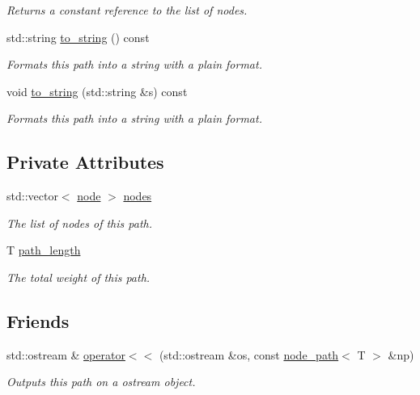 \begin{DoxyCompactItemize}
\begin{DoxyCompactList}\small\item\em Returns a constant reference to the list of nodes. \end{DoxyCompactList}\item 
std\-::string \hyperlink{classlgraph_1_1node__path_a3b1a3f9fbe6ef537d5c2d0cd11fdf001}{to\-\_\-string} () const 
\begin{DoxyCompactList}\small\item\em Formats this path into a string with a plain format. \end{DoxyCompactList}\item 
void \hyperlink{classlgraph_1_1node__path_a87d9396f83248eca743bd97c3adde674}{to\-\_\-string} (std\-::string \&s) const 
\begin{DoxyCompactList}\small\item\em Formats this path into a string with a plain format. \end{DoxyCompactList}\end{DoxyCompactItemize}
\subsection*{Private Attributes}
\begin{DoxyCompactItemize}
\item 
\hypertarget{classlgraph_1_1node__path_ae2335b4883c602186ce2dbba9d679b1e}{std\-::vector$<$ \hyperlink{namespacelgraph_a397169dd66adf725210a30fb7251773e}{node} $>$ \hyperlink{classlgraph_1_1node__path_ae2335b4883c602186ce2dbba9d679b1e}{nodes}}\label{classlgraph_1_1node__path_ae2335b4883c602186ce2dbba9d679b1e}

\begin{DoxyCompactList}\small\item\em The list of nodes of this path. \end{DoxyCompactList}\item 
T \hyperlink{classlgraph_1_1node__path_a3461f9839615e5bc4837d24438117f16}{path\-\_\-length}
\begin{DoxyCompactList}\small\item\em The total weight of this path. \end{DoxyCompactList}\end{DoxyCompactItemize}
\subsection*{Friends}
\begin{DoxyCompactItemize}
\item 
std\-::ostream \& \hyperlink{classlgraph_1_1node__path_a97671ba034a7baa54df38ba323d7a48e}{operator$<$$<$} (std\-::ostream \&os, const \hyperlink{classlgraph_1_1node__path}{node\-\_\-path}$<$ T $>$ \&np)
\begin{DoxyCompactList}\small\item\em Outputs this path on a {\itshape ostream} object. \end{DoxyCompactList}\end{DoxyCompactItemize}


